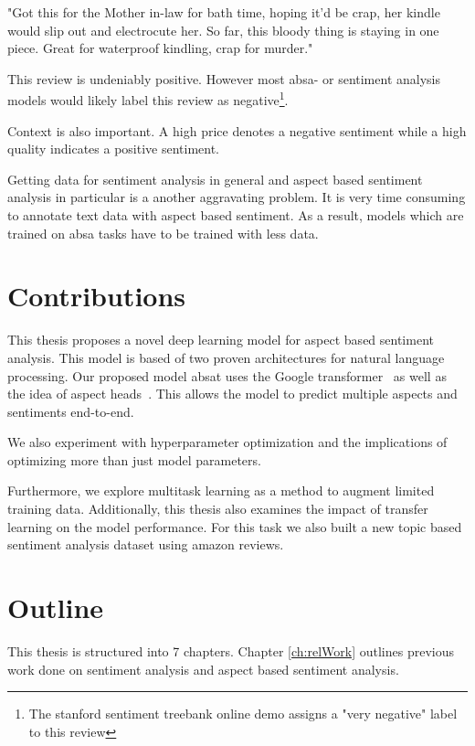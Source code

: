 \begin{center}
	"Got this for the Mother in-law for bath time, hoping it'd be crap, her kindle would slip out and electrocute her. So far, this bloody thing is staying in one piece. Great for waterproof kindling, crap for murder."
\end{center}

This review is undeniably positive. However most \gls{absa}- or sentiment analysis models would likely label this review as negative\footnote{The stanford sentiment treebank online demo assigns a "very negative" label to this review}.

Context is also important. A high price denotes a negative sentiment while a high quality indicates a positive sentiment.
\medskip

Getting data for sentiment analysis in general and aspect based sentiment analysis in particular is a another aggravating problem. It is very time consuming to annotate text data with aspect based sentiment. As a result, models which are trained on \gls{absa} tasks have to be trained with less data.

\section{Contributions}

This thesis proposes a novel deep learning model for aspect based sentiment analysis. This model is based of two proven architectures for natural language processing. Our proposed model \acrfull{absat} uses the Google transformer~\cite{Vaswani2017d} as well as the idea of aspect heads~\cite{Schmitt2018}. This allows the model to predict multiple aspects and sentiments end-to-end.
\medskip

We also experiment with hyperparameter optimization and the implications of optimizing more than just model parameters.

Furthermore, we explore multitask learning as a method to augment limited training data. Additionally, this thesis also examines the impact of transfer learning on the model performance. For this task we also built a new topic based sentiment analysis dataset using amazon reviews.

\section{Outline}

This thesis is structured into 7 chapters. Chapter \ref{ch:relWork} outlines previous work done on sentiment analysis and aspect based sentiment analysis.
\smallskip


